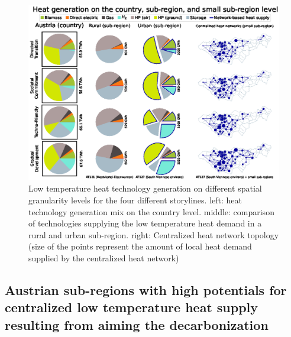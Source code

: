 \begin{figure}
	\centering
	\includegraphics[width=1\linewidth]{figures/4_Results/Spatial_results.eps}
	\caption{Low temperature heat technology generation on different spatial granularity levels for the four different storylines. left: heat technology generation mix on the country level. middle: comparison of technologies supplying the low temperature heat demand in a rural and urban sub-region. right: Centralized heat network topology (size of the points represent the amount of local heat demand supplied by the centralized heat network)}
	\label{fig:res1}
\end{figure}
\newpage
\subsection{Austrian sub-regions with high potentials for centralized low temperature heat supply resulting from aiming the decarbonization}\label{res:3}

